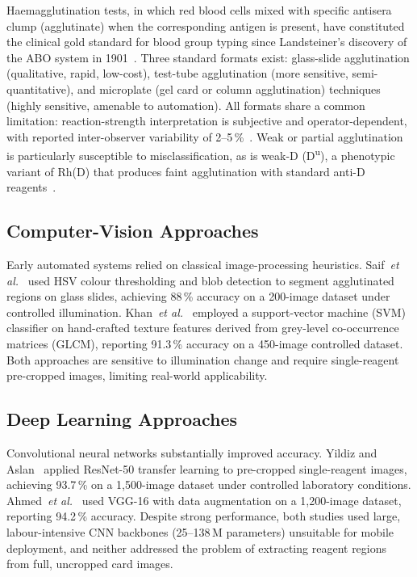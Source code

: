 \documentclass[journal]{IEEEtran}
\begin{document}
Haemagglutination tests, in which red blood cells mixed with
specific antisera clump (agglutinate) when the corresponding antigen
is present, have constituted the clinical gold standard for blood
group typing since Landsteiner's discovery of the ABO system in
1901~\cite{landsteiner1901}.
Three standard formats exist: glass-slide agglutination
(qualitative, rapid, low-cost), test-tube agglutination (more
sensitive, semi-quantitative), and microplate (gel card or column
agglutination) techniques (highly sensitive, amenable to automation).
All formats share a common limitation: reaction-strength
interpretation is subjective and operator-dependent, with reported
inter-observer variability of 2--5\,\%~\cite{harmening2019}.
Weak or partial agglutination is particularly susceptible to
misclassification, as is weak-D (D\textsuperscript{u}), a
phenotypic variant of Rh(D) that produces faint agglutination
with standard anti-D reagents~\cite{harmening2019}.

\subsection{Computer-Vision Approaches}

Early automated systems relied on classical image-processing
heuristics.
Saif~\emph{et al.}~\cite{saif2016} used HSV colour thresholding
and blob detection to segment agglutinated regions on glass slides,
achieving 88\,\% accuracy on a 200-image dataset under controlled
illumination.
Khan~\emph{et al.}~\cite{khan2018} employed a support-vector machine
(SVM) classifier on hand-crafted texture features derived from
grey-level co-occurrence matrices (GLCM), reporting 91.3\,\% accuracy
on a 450-image controlled dataset.
Both approaches are sensitive to illumination change and require
single-reagent pre-cropped images, limiting real-world applicability.

\subsection{Deep Learning Approaches}

Convolutional neural networks substantially improved accuracy.
Yildiz and Aslan~\cite{yildiz2020} applied ResNet-50 transfer
learning to pre-cropped single-reagent images, achieving 93.7\,\%
on a 1,500-image dataset under controlled laboratory conditions.
Ahmed~\emph{et al.}~\cite{ahmed2021} used VGG-16 with data
augmentation on a 1,200-image dataset, reporting 94.2\,\% accuracy.
Despite strong performance, both studies used large, labour-intensive
CNN backbones (25--138\,M parameters) unsuitable for mobile deployment,
and neither addressed the problem of extracting reagent regions from
full, uncropped card images.
\end{document}
